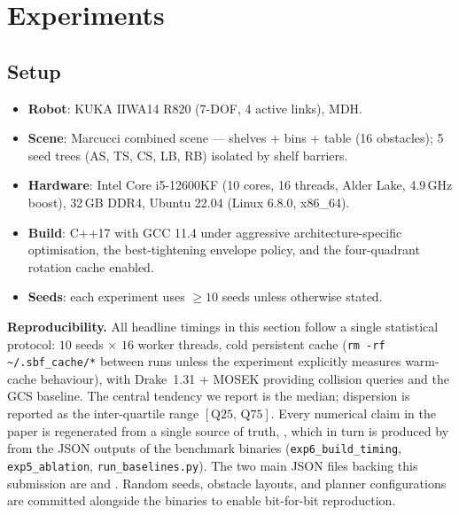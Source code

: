 \documentclass[journal]{IEEEtran}
\begin{document}
\section{Experiments}\label{sec:experiments}

\subsection{Setup}

\begin{itemize}[nosep]
  \item \textbf{Robot}: KUKA IIWA14 R820 (7-DOF, 4 active links), MDH.
  \item \textbf{Scene}: Marcucci combined scene --- shelves + bins + table
    (16 obstacles); 5 seed trees (AS, TS, CS, LB, RB) isolated by
    shelf barriers.
  \item \textbf{Hardware}: Intel Core i5-12600KF (10 cores, 16 threads,
    Alder Lake, 4.9\,GHz boost), 32\,GB DDR4, Ubuntu 22.04
    (Linux 6.8.0, x86\_64).
  \item \textbf{Build}: C++17 with GCC 11.4 under aggressive
    architecture-specific optimisation, the best-tightening envelope
    policy, and the four-quadrant rotation cache enabled.
  \item \textbf{Seeds}: each experiment uses $\geq 10$ seeds unless
    otherwise stated.
\end{itemize}

\textbf{Reproducibility.}
All headline timings in this section follow a single statistical
protocol: $10$ seeds $\times$ $16$ worker threads, cold persistent
cache (\texttt{rm -rf \textasciitilde/.sbf\_cache/*} between runs unless
the experiment explicitly measures warm-cache behaviour), with
Drake~1.31 + MOSEK providing collision queries and the GCS baseline.
The central tendency we report is the median; dispersion is reported
as the inter-quartile range $[\text{Q25},\,\text{Q75}]$.
Every numerical claim in the paper is regenerated from a single source
of truth, , which in
turn is produced by
 from the JSON outputs of
the benchmark binaries (\texttt{exp6\_build\_timing},
\texttt{exp5\_ablation}, \texttt{run\_baselines.py}). The two main JSON
files backing this submission are
 and
.
Random seeds, obstacle layouts, and planner configurations are
committed alongside the binaries to enable bit-for-bit reproduction.
\end{document}
